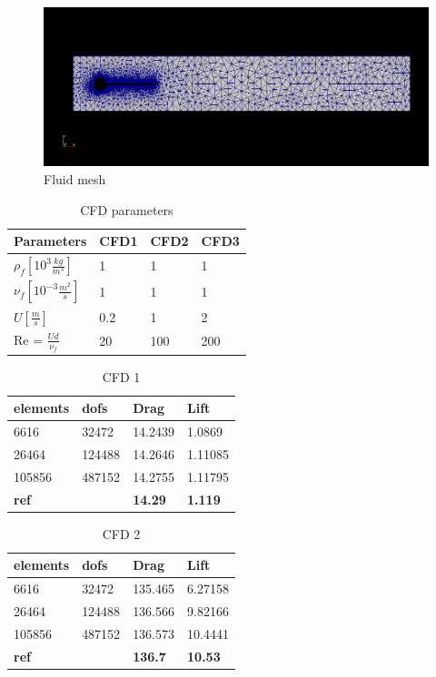 \begin{figure}[H]
\caption{Fluid mesh}
\includegraphics[scale=0.5,trim={24mm 46mm 14mm 40mm},clip]{./Verification_Validation/Hron_Turek/fluid.png}
\end{figure}

\vspace{1cm}

\begin{table}[H]
\centering
\caption{CFD parameters}
\label{my-label}
\begin{tabular}{|l|l|l|l|}
\hline
Parameters & CFD1 & CFD2 & CFD3 \\ \hline
$\rho_f [10^3 \frac{kg}{m^3}]$ & 1 & 1 & 1 \\ \hline
$\nu_f [10^{-3} \frac{m^2}{s}]$ & 1 & 1 & 1 \\ \hline
$ U [\frac{m}{s}] $ & 0.2 & 1 & 2 \\ \hline
Re = $\frac{Ud}{\nu_f}$ & 20 & 100 & 200 \\ \hline
\end{tabular}
\end{table}

\begin{table}[H]
\centering
\caption{CFD 1}
\label{my-label}
\begin{tabular}{|l|l|l|l|}
\hline
\textbf{elements} & \textbf{dofs} & \textbf{Drag} & \textbf{Lift} \\ \hline
6616 & 32472 & 14.2439 & 1.0869 \\ \hline
26464 & 124488 & 14.2646 & 1.11085 \\ \hline
105856 & 487152 & 14.2755 & 1.11795 \\ \hline
\textbf{ref} & \textbf{} & \textbf{14.29} & \textbf{1.119} \\ \hline
\end{tabular}
\end{table}

\begin{table}[H]
\centering
\caption{CFD 2}
\label{my-label}
\begin{tabular}{|l|l|l|l|}
\hline
\textbf{elements} & \textbf{dofs} & \textbf{Drag} & \textbf{Lift} \\ \hline
6616 & 32472 & 135.465 & 6.27158 \\ \hline
26464 & 124488 & 136.566 & 9.82166 \\ \hline
105856 & 487152 & 136.573 & 10.4441 \\ \hline
\textbf{ref} & \textbf{} & \textbf{136.7} & \textbf{10.53} \\ \hline
\end{tabular}
\end{table}

